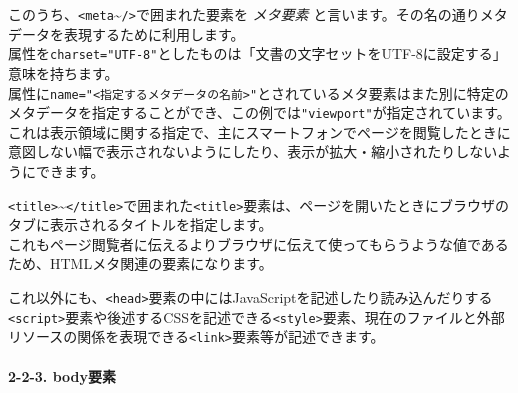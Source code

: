 \begin{Shaded}
\begin{Highlighting}[]
\DataTypeTok{\textless{}}\DataTypeTok{\textgreater{}}
  \DataTypeTok{\textless{}}\OperatorTok{=}\OtherTok{ }\DataTypeTok{/\textgreater{}}
  \DataTypeTok{\textless{}}\OperatorTok{=}\OperatorTok{=}\OtherTok{ }\DataTypeTok{/\textgreater{}}
  \DataTypeTok{\textless{}}\DataTypeTok{\textgreater{}}\DataTypeTok{\textless{}/}\DataTypeTok{\textgreater{}}
\DataTypeTok{\textless{}/}\DataTypeTok{\textgreater{}}
\end{Highlighting}
\end{Shaded}

このうち、\texttt{\textless{}meta}\textasciitilde{}\texttt{/\textgreater{}}で囲まれた要素を
\emph{メタ要素}
と言います。その名の通りメタデータを表現するために利用します。\\
属性を\texttt{charset="UTF-8"}としたものは「文書の文字セットをUTF-8に設定する」意味を持ちます。\\
属性に\texttt{name="\textless{}指定するメタデータの名前\textgreater{}"}とされているメタ要素はまた別に特定のメタデータを指定することができ、この例では\texttt{"viewport"}が指定されています。\\
これは表示領域に関する指定で、主にスマートフォンでページを閲覧したときに意図しない幅で表示されないようにしたり、表示が拡大・縮小されたりしないようにできます。

\texttt{\textless{}title\textgreater{}}\textasciitilde{}\texttt{\textless{}/title\textgreater{}}で囲まれた\texttt{\textless{}title\textgreater{}}要素は、ページを開いたときにブラウザのタブに表示されるタイトルを指定します。\\
これもページ閲覧者に伝えるよりブラウザに伝えて使ってもらうような値であるため、HTMLメタ関連の要素になります。

これ以外にも、\texttt{\textless{}head\textgreater{}}要素の中にはJavaScriptを記述したり読み込んだりする\texttt{\textless{}script\textgreater{}}要素や後述するCSSを記述できる\texttt{\textless{}style\textgreater{}}要素、現在のファイルと外部リソースの関係を表現できる\texttt{\textless{}link\textgreater{}}要素等が記述できます。

\paragraph{2-2-3. body要素}\label{bodyux8981ux7d20}

